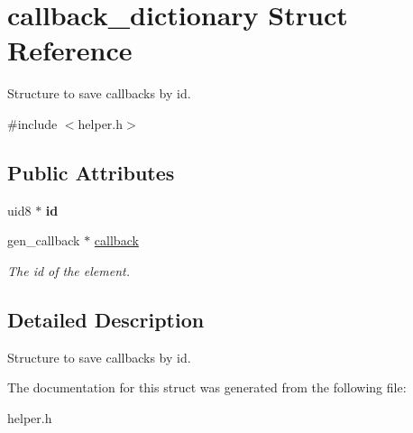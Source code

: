 \hypertarget{structcallback__dictionary}{\section{callback\+\_\+dictionary Struct Reference}
\label{structcallback__dictionary}
}


Structure to save callbacks by id.  




{\ttfamily \#include $<$helper.\+h$>$}

\subsection*{Public Attributes}
\begin{DoxyCompactItemize}
\item 
\hypertarget{structcallback__dictionary_a187a4d00861c73b3b963f4d2aee346a5}{uid8 $\ast$ {\bfseries id}}\label{structcallback__dictionary_a187a4d00861c73b3b963f4d2aee346a5}

\item 
\hypertarget{structcallback__dictionary_ae5bf2254961e10c73b9ef12dbab36440}{gen\+\_\+callback $\ast$ \hyperlink{structcallback__dictionary_ae5bf2254961e10c73b9ef12dbab36440}{callback}}\label{structcallback__dictionary_ae5bf2254961e10c73b9ef12dbab36440}

\begin{DoxyCompactList}\small\item\em The id of the element. \end{DoxyCompactList}\end{DoxyCompactItemize}


\subsection{Detailed Description}
Structure to save callbacks by id. 

The documentation for this struct was generated from the following file\+:\begin{DoxyCompactItemize}
\item 
helper.\+h\end{DoxyCompactItemize}

